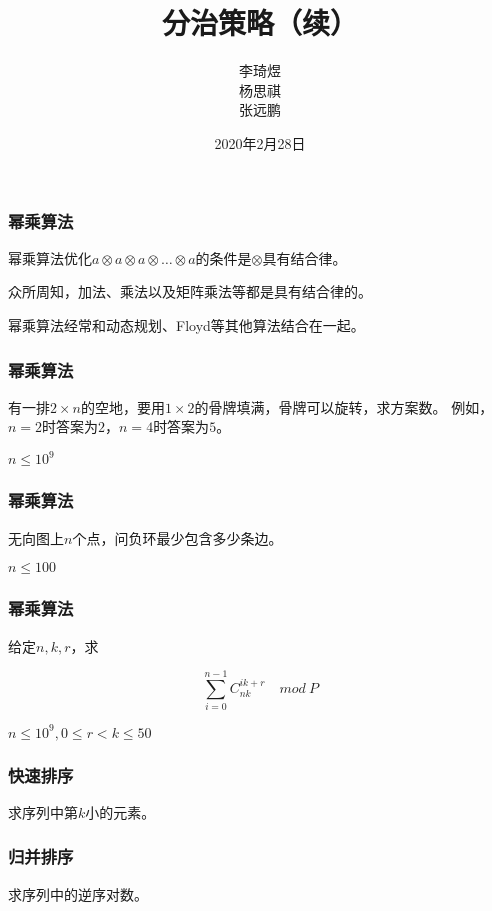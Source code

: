 \documentclass{ctexbeamer}
\title{分治策略（续）}
\author{李琦煜 \\ 杨思祺 \\ 张远鹏}
\institute{算法设计与分析2020小班17}
\date{2020年2月28日}
\begin{document}
    \begin{frame}
        \maketitle
    \end{frame}

    \begin{frame}
        \frametitle{幂乘算法}

        幂乘算法优化$a\otimes a\otimes a\otimes \ldots \otimes a$的条件是$\otimes$具有结合律。
        
        众所周知，加法、乘法以及矩阵乘法等都是具有结合律的。

        幂乘算法经常和动态规划、Floyd等其他算法结合在一起。

    \end{frame}

    \begin{frame}
        \frametitle{幂乘算法}

        有一排$2\times n$的空地，要用$1\times 2$的骨牌填满，骨牌可以旋转，求方案数。
        例如，$n=2$时答案为$2$，$n=4$时答案为$5$。

        $n\leq 10^9$

    \end{frame}

    \begin{frame}
        \frametitle{幂乘算法}

        无向图上$n$个点，问负环最少包含多少条边。

        $n\leq 100$

    \end{frame}

    \begin{frame}
        \frametitle{幂乘算法}

        给定$n,k,r$，求

        $$
        \sum_{i=0}^{n-1}{C_{nk}^{ik+r}} \quad mod \ P
        $$

        $n\leq 10^9,0\leq r < k \leq 50$

    \end{frame}

    \begin{frame}
        \frametitle{快速排序}

        求序列中第$k$小的元素。

    \end{frame}

    \begin{frame}
        \frametitle{归并排序}

        求序列中的逆序对数。

    \end{frame}
\end{document}
